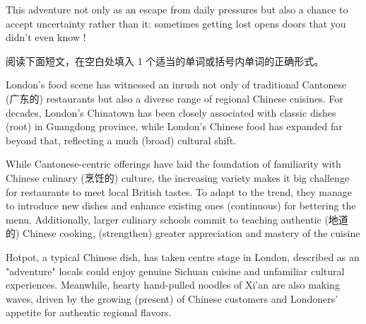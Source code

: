 \documentclass{英语试卷}
\begin{document}
\par This adventure  not only as an escape from daily pressures but also a chance to accept uncertainty rather than  it: sometimes getting lost opens doors that you didn't even know !\par
{}
\par 阅读下面短文，在空白处填入 1 个适当的单词或括号内单词的正确形式。\par
\par London's food scene has witnessed an inrush not only of traditional Cantonese (广东的) restaurants but also a diverse range of regional Chinese cuisines. For decades, London's Chinatown has been closely associated with classic dishes  (root) in Guangdong province, while London's Chinese food has expanded far beyond that, reflecting a much  (broad) cultural shift.\par
\par While Cantonese-centric offerings have laid the foundation of familiarity with Chinese culinary (烹饪的) culture, the increasing variety makes it  big challenge for restaurants to meet local British tastes. To adapt to the trend, they manage to introduce new dishes and enhance existing ones  (continuous) for bettering the menu. Additionally, larger culinary schools commit to teaching authentic (地道的) Chinese cooking,  (strengthen) greater appreciation and mastery of the cuisine\par
\par Hotpot, a typical Chinese dish, has taken centre stage in London, described as an "adventure"  locals could enjoy genuine Sichuan cuisine and unfamiliar cultural experiences. Meanwhile, hearty hand-pulled noodles of Xi'an are also making waves, driven by the growing  (present) of Chinese customers and Londoners' appetite for authentic regional flavors.\par
\end{document}
